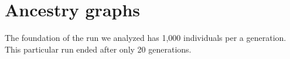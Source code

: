 




\section{Ancestry graphs}
\label{sec:ancestryGraphs}



The foundation of the run we analyzed has 1,000 individuals per a generation. This particular run
ended after only 20 generations.

